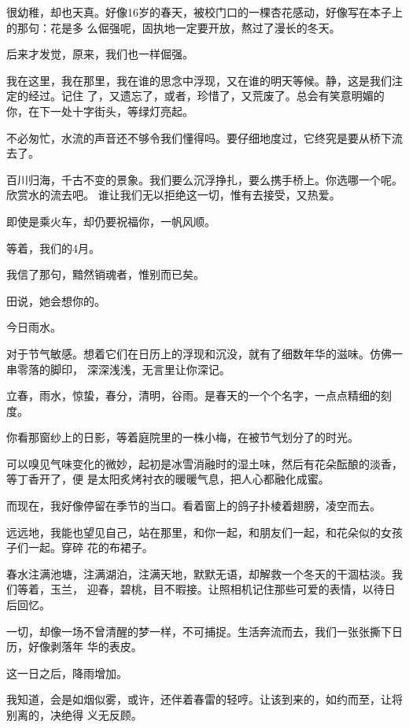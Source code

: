 		很幼稚，却也天真。好像16岁的春天，被校门口的一棵杏花感动，好像写在本子上的那句：花是多
	么倔强呢，固执地一定要开放，熬过了漫长的冬天。

		后来才发觉，原来，我们也一样倔强。

		我在这里，我在那里，我在谁的思念中浮现，又在谁的明天等候。静，这是我们注定的经过。记住
	了，又遗忘了，或者，珍惜了，又荒废了。总会有笑意明媚的你，在下一处十字街头，等绿灯亮起。

		不必匆忙，水流的声音还不够令我们懂得吗。要仔细地度过，它终究是要从桥下流去了。

		百川归海，千古不变的景象。我们要么沉浮挣扎，要么携手桥上。你选哪一个呢。欣赏水的流去吧。
	谁让我们无以拒绝这一切，惟有去接受，又热爱。

		即使是乘火车，却仍要祝福你，一帆风顺。

		等着，我们的4月。

		我信了那句，黯然销魂者，惟别而已矣。

		田说，她会想你的。

	\endwriting



		今日雨水。

		对于节气敏感。想着它们在日历上的浮现和沉没，就有了细数年华的滋味。仿佛一串零落的脚印，
	深深浅浅，无言里让你深记。

		立春，雨水，惊蛰，春分，清明，谷雨。是春天的一个个名字，一点点精细的刻度。

		你看那窗纱上的日影，等着庭院里的一株小梅，在被节气划分了的时光。

		可以嗅见气味变化的微妙，起初是冰雪消融时的湿土味，然后有花朵酝酿的淡香，等丁香开了，便
	是太阳炙烤衬衣的暖暖气息，把人心都融化成蜜。

		而现在，我好像停留在季节的当口。看着窗上的鸽子扑棱着翅膀，凌空而去。

		远远地，我能也望见自己，站在那里，和你一起，和朋友们一起，和花朵似的女孩子们一起。穿碎
	花的布裙子。

		春水注满池塘，注满湖泊，注满天地，默默无语，却解救一个冬天的干涸枯淡。我们等着，玉兰，
	迎春，碧桃，目不暇接。让照相机记住那些可爱的表情，以待日后回忆。

		一切，却像一场不曾清醒的梦一样，不可捕捉。生活奔流而去，我们一张张撕下日历，好像剥落年
	华的表皮。

		这一日之后，降雨增加。

		我知道，会是如烟似雾，或许，还伴着春雷的轻哼。让该到来的，如约而至，让将别离的，决绝得
	义无反顾。

